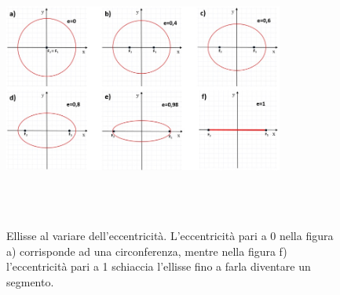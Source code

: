 \begin{description}
\begin{figure}[h]
  \centering%
  \includegraphics[height=9.2cm, width=9.2cm, keepaspectratio] 
{img/eccentricita.jpg}%
  \caption{Ellisse al variare dell'eccentricità. L'eccentricità pari 
a 0 nella figura a) corrisponde ad una circonferenza, mentre nella figura 
f) l'eccentricità pari a 1 schiaccia l'ellisse fino a farla diventare un 
segmento.}%
\end{figure}
\end{description}

